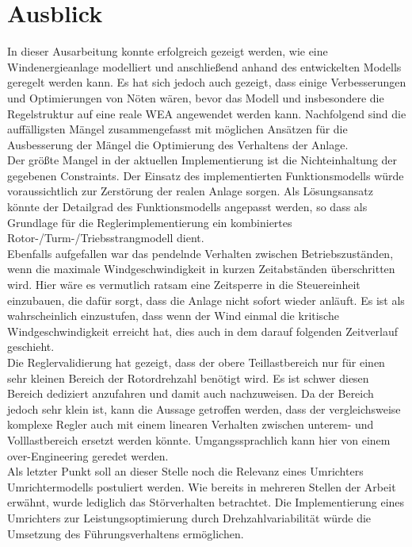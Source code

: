 \section{Ausblick} \label{ausblick}

In dieser Ausarbeitung konnte erfolgreich gezeigt werden, wie eine Windenergieanlage modelliert und anschließend anhand des entwickelten Modells geregelt werden kann. Es hat sich jedoch auch gezeigt, dass einige Verbesserungen und Optimierungen von Nöten wären, bevor das Modell und insbesondere die Regelstruktur auf eine reale WEA angewendet werden kann. Nachfolgend sind die auffälligsten Mängel zusammengefasst mit möglichen Ansätzen für die Ausbesserung der Mängel \bzw die Optimierung des Verhaltens der Anlage.\\

Der größte Mangel in der aktuellen Implementierung ist die Nichteinhaltung der gegebenen Constraints. Der Einsatz des implementierten Funktionsmodells würde voraussichtlich zur Zerstörung der realen Anlage sorgen. Als Lösungsansatz könnte der Detailgrad des Funktionsmodells angepasst werden, so dass als Grundlage für die Reglerimplementierung ein kombiniertes Rotor-/Turm-/Triebsstrangmodell dient.\\

Ebenfalls aufgefallen war das pendelnde Verhalten zwischen Betriebszuständen, wenn die maximale Windgeschwindigkeit in kurzen Zeitabständen überschritten wird. Hier wäre es vermutlich ratsam eine Zeitsperre in die Steuereinheit einzubauen, die dafür sorgt, dass die Anlage nicht sofort wieder anläuft. Es ist als wahrscheinlich einzustufen, dass wenn der Wind einmal die kritische Windgeschwindigkeit erreicht hat, dies auch in dem darauf folgenden Zeitverlauf geschieht.\\

Die Reglervalidierung hat gezeigt, dass der obere Teillastbereich nur für einen sehr kleinen Bereich der Rotordrehzahl benötigt wird. Es ist schwer diesen Bereich dediziert anzufahren und damit auch nachzuweisen. Da der Bereich jedoch sehr klein ist, kann die Aussage getroffen werden, dass der vergleichsweise komplexe Regler auch mit einem linearen Verhalten zwischen unterem- und Volllastbereich ersetzt werden könnte. Umgangssprachlich kann hier von einem over-Engineering geredet werden.\\

Als letzter Punkt soll an dieser Stelle noch die Relevanz eines Umrichters \bzw Umrichtermodells postuliert werden. Wie bereits in mehreren Stellen der Arbeit erwähnt, wurde lediglich das Störverhalten betrachtet. Die Implementierung eines Umrichters zur Leistungsoptimierung durch Drehzahlvariabilität würde die Umsetzung des Führungsverhaltens ermöglichen.